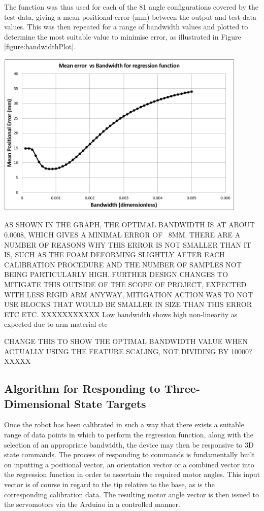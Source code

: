 \documentclass[11pt]{article}
\begin{document}
The function was thus used for each of the 81 angle configurations covered by the test data, giving a mean positional error (mm) between the output and test data values. This was then repeated for a range of bandwidth values and plotted to determine the most suitable value to minimise error, as illustrated in Figure \ref{figure:bandwidthPlot}.


\begin{center}
\includegraphics[width=0.9\textwidth]{images/bandwidthPlot.png}
\label{figure:bandwidthPlot}
\end{center}

AS SHOWN IN THE GRAPH, THE OPTIMAL BANDWIDTH IS AT ABOUT 0.0008, WHICH GIVES A MINIMAL ERROR OF ~8MM. THERE ARE A NUMBER OF REASONS WHY THIS ERROR IS NOT SMALLER THAN IT IS, SUCH AS THE FOAM DEFORMING SLIGHTLY AFTER EACH CALIBRATION PROCEDURE AND THE NUMBER OF SAMPLES NOT BEING PARTICULARLY HIGH. FURTHER DESIGN CHANGES TO MITIGATE THIS OUTSIDE OF THE SCOPE OF PROJECT, EXPECTED WITH LESS RIGID ARM ANYWAY, MITIGATION ACTION WAS TO NOT USE BLOCKS THAT WOULD BE SMALLER IN SIZE THAN THIS ERROR ETC ETC. XXXXXXXXXXX
Low bandwidth shows high non-linearity as expected due to arm material etc


CHANGE THIS TO SHOW THE OPTIMAL BANDWIDTH VALUE WHEN ACTUALLY USING THE FEATURE SCALING, NOT DIVIDING BY 10000? XXXXX

\pagebreak 
\subsection{Algorithm for Responding to Three-Dimensional State Targets}
Once the robot has been calibrated in such a way that there exists a suitable range of data points in which to perform the regression function, along with the selection of an appropriate bandwidth, the device may then be responsive to 3D state commands.
The process of responding to commands is fundamentally built on inputting a positional vector, an orientation vector or a combined vector into the regression function in order to ascertain the required motor angles. This input vector is of course in regard to the tip relative to the base, as is the corresponding calibration data. The resulting motor angle vector is then issued to the servomotors via the Arduino in a controlled manner. 
\end{document}
